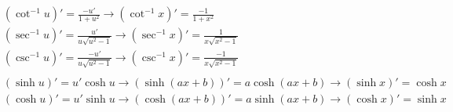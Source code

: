 \begin{align*}
&(\cot^{-1} u)' = \frac{-u'}{1+u^2} \longrightarrow (\cot^{-1}x)' = \frac{-1}{1+x^2} \\
&(\sec^{-1}u)' = \frac{u'}{u\sqrt{u^2-1}} \longrightarrow (\sec^{-1}x)' = \frac{1}{x\sqrt{x^2-1}} \\
&(\csc^{-1}u)' = \frac{-u'}{u\sqrt{u^2-1}} \longrightarrow (\csc^{-1}x)' = \frac{-1}{x\sqrt{x^2-1}} \\
\\
&(\sinh u)' = u'\cosh u \longrightarrow (\sinh(ax+b))' = a\cosh(ax+b) \longrightarrow (\sinh x)' = \cosh x \\
&(\cosh u)' = u'\sinh u \longrightarrow (\cosh(ax+b))' = a\sinh(ax+b) \longrightarrow (\cosh x)' = \sinh x  \\
\end{align*}
